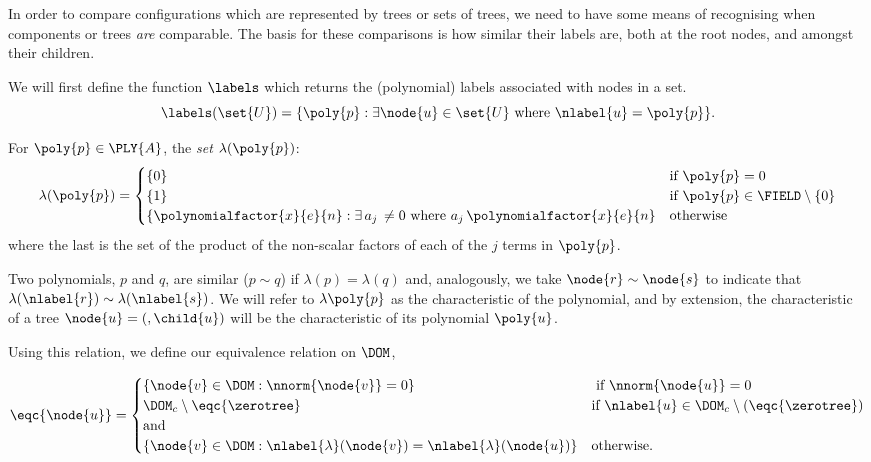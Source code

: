 In order to compare configurations which are represented by trees or
sets of trees, we need to have some means of recognising when
components or trees \emph{are\/} comparable. The basis for these
comparisons is how similar their labels are, both at the root nodes,
and amongst their children.


\begin{definition}
  We will first define the function $\labels$ which returns the
  (polynomial) labels associated with nodes in a set. 
  \[
  \labels(\set{U}) = \{\poly{p}: \exists \node{u}\in\set{U}
  \text{ where }
  \nlabel{u} = \poly{p}\}.
  \]
\end{definition}


\begin{definition}\label{equivclass}
  For $\poly{p}\in\PLY{A}$, the \emph{set} $\lambda(\poly{p})$:
  \begin{equation*}
    \lambda(\poly{p}) = \begin{cases}
      \{0\} & \text{if } \poly{p} = 0 \\
      \{1\} & \text{if }\poly{p}\in\FIELD\setminus\{0\} \\
      \{\polynomialfactor{x}{e}{n}: \exists\, a_j\, \neq 0
      \text{ where $a_j\,\polynomialfactor{x}{e}{n}$}
        &\text{otherwise} \\
    \end{cases}
  \end{equation*}
  where the last is the set of the product of the non-scalar factors
  of each of the $j$ terms in $\poly{p}$.
\end{definition}

Two polynomials, $p$ and $q$, are similar ($p \sim q$) if $\lambda(p)
= \lambda(q)$ and, analogously, we take $\node{r}\sim\node{s}$ to
indicate that $\lambda(\nlabel{r}) \sim \lambda(\nlabel{s})$. We will
refer to $\lambda{\poly{p}}$ as the characteristic of the polynomial,
and by extension, the characteristic of a tree $\node{u} = (\label{u},
\child{u})$ will be the characteristic of its polynomial $\poly{u}$.

Using this relation, we define our equivalence relation on $\DOM$,
\begin{definition}
  \begin{equation}
    \eqc{\node{u}} = \begin{cases}
      \{\node{v} \in \DOM: \nnorm{\node{v}} = 0\} & \text{ if } \nnorm{\node{u}} = 0 \\
      \DOM_c\setminus\eqc{\zerotree} & \text{if } \nlabel{u}\in\DOM_c \setminus(\eqc{\zerotree})\\
      \text{\hfill and } & \\
      \{\node{v} \in \DOM: \nlabel{\lambda}({\node{v}}) = \nlabel{\lambda}({\node{u}})\} & \text{otherwise}.
    \end{cases}
  \end{equation}
\end{definition}

